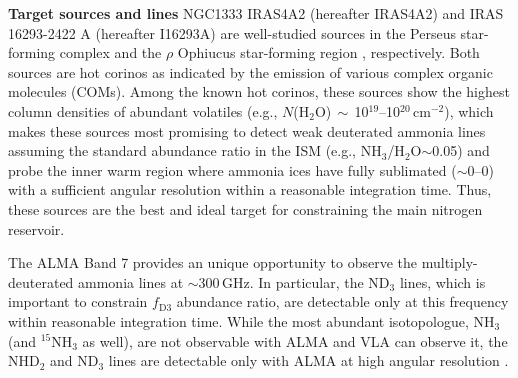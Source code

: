 \documentclass[12pt,a4paper]{article}  %
\newcommand{\ammonia}{NH$_3$\xspace}
\begin{document}



\medskip
\noindent \textbf{Target sources and lines} \quad NGC1333 IRAS4A2 (hereafter IRAS4A2) and IRAS 16293-2422 A (hereafter I16293A) are well-studied sources in the Perseus star-forming complex \citep[$\sim$300\,pc;][]{Zucker18} and the $\rho$ Ophiucus star-forming region \citep[$\sim$140\,pc;][]{Dzib18}, respectively. Both sources are hot corinos as indicated by the emission of various complex organic molecules (COMs).
Among the known hot corinos, these sources show the highest column densities of abundant volatiles (e.g., $N$(H$_2$O)$\,\sim\,$10$^{19}$--10$^{20}$\,cm$^{-2}$), which makes these sources most promising to detect weak deuterated ammonia lines assuming the standard abundance ratio in the ISM (e.g., NH$_3$/H$_2$O$\sim$0.05) and probe the inner warm region where ammonia ices have fully sublimated ($\sim$0--0) with a sufficient angular resolution within a reasonable integration time. 
Thus, these sources are the best and ideal target for constraining the main nitrogen reservoir.

\smallskip
\noindent The ALMA Band 7 provides an unique opportunity to observe the multiply-deuterated ammonia lines at $\sim$300\,GHz. In particular, the ND$_3$ lines, which is important to constrain $f_\mathrm{D3}$ abundance ratio, are detectable only at this frequency within reasonable integration time. While the most abundant isotopologue, \ammonia (and $^{15}$NH$_3$ as well), are not observable with ALMA and VLA can observe it, the NHD$_2$ and ND$_3$ lines are detectable only with ALMA at high angular resolution \citep{Furuya18}.    
\end{document}
